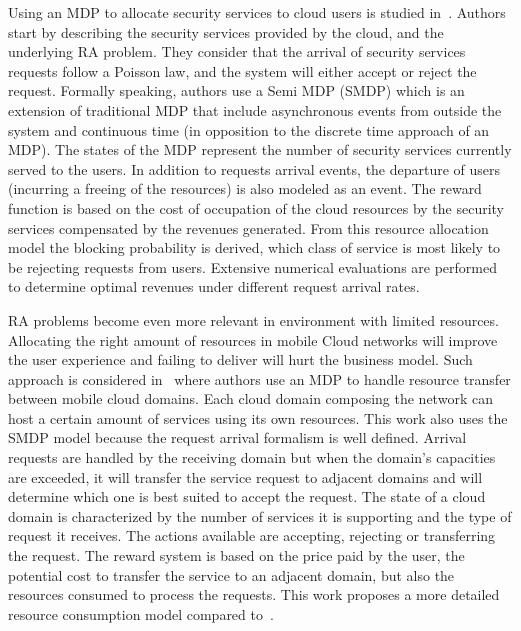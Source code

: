 Using an MDP to allocate security services to cloud users is studied in~\cite{Liang2011}.
Authors start by describing the security services provided by the cloud, and the underlying RA problem.
They consider that the arrival of security services requests follow a Poisson law, and the system will either accept or reject the request. Formally speaking, authors use a Semi MDP (SMDP) which is an extension of traditional MDP that include asynchronous events from outside the system and continuous time (in opposition to the discrete time approach of an MDP).
The states of the MDP represent the number of security services currently served to the users. In addition to requests arrival events, the departure of users (incurring a freeing of the resources) is also modeled as an event. The reward function is based on the cost of occupation of the cloud resources by the security services compensated by the revenues generated. 
From this resource allocation model the blocking probability is derived, \ie which class of service is most likely to be rejecting requests from users. Extensive numerical evaluations are performed to determine optimal revenues under different request arrival rates.

RA problems become even more relevant in environment with limited resources.
Allocating the right amount of resources in mobile Cloud networks will improve the user experience and failing to deliver will hurt the business model.
Such approach is considered in~\cite{Liang2012} where authors use an MDP to handle resource transfer between mobile cloud domains. Each cloud domain composing the network can host a certain amount of services using its own resources. 
This work also uses the SMDP model because the request arrival formalism is well defined.
Arrival requests are handled by the receiving domain but when the domain's capacities are exceeded, it will transfer the service request to adjacent domains and will determine which one is best suited to accept the request.
The state of a cloud domain is characterized by the number of services it is supporting and the type of request it receives.
The actions available are accepting, rejecting or transferring the request.
The reward system is based on the price paid by the user, the potential cost to transfer the service to an adjacent domain, but also the resources consumed to process the requests. 
This work proposes a more detailed resource consumption model compared to~\cite{Liang2011}.

